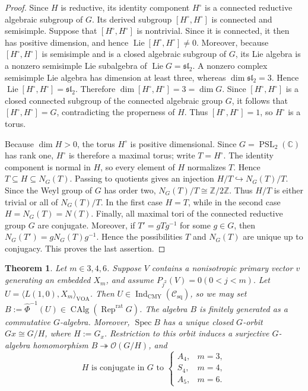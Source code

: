 \documentclass[10pt,a4paper]{amsart}
\numberwithin{equation}{section} \newtheorem{thm}{Theorem}[section] \newtheorem{lem}[thm]{Lemma} \newtheorem{ex}[thm]{Example} \newtheorem{prop}[thm]{Proposition} \newtheorem{cor}[thm]{Corollary} \newtheorem{defi}[thm]{Definition} \newtheorem{rmk}[thm]{Remark} \newtheorem{notation}[thm]{Notation}
\newcommand{\Rep}{\operatorname{Rep}}
\newcommand{\Spec}{\operatorname{Spec}}
\newcommand{\PSL}{\operatorname{PSL}}
\newcommand{\OO}{\mathcal O}
\newcommand{\Csq}{\mathcal C_{\mathrm{sq}}}
\newcommand{\CAlg}{\operatorname{CAlg}}
\newcommand{\IndCMY}{\operatorname{Ind}_{\mathrm{CMY}}}
\def\Z{\mathbb{Z}} \def\N{\mathbb{N}} \def\A{\mathbb{A}} \def\C{\mathbb{C}} \def\R{\mathbb{R}} \def\Q{\mathbb{Q}} \def\F{\mathbb{F}}
\begin{document}
\begin{proof}
Since $H$ is reductive, its identity component $H^\circ$ is a connected reductive algebraic subgroup of $G$. Its derived subgroup $[H^\circ,H^\circ]$ is connected and semisimple. Suppose that $[H^\circ,H^\circ]$ is nontrivial. Since it is connected, it then has positive dimension, and hence \(\operatorname{Lie}[H^\circ,H^\circ]\neq0.\) Moreover, because $[H^\circ,H^\circ]$ is semisimple and is a closed algebraic subgroup of $G$, its Lie algebra is a nonzero semisimple Lie subalgebra of \(\operatorname{Lie}G=\mathfrak{sl}_2.\) A nonzero complex semisimple Lie algebra has dimension at least three, whereas $\dim\mathfrak{sl}_2=3$. Hence \(\operatorname{Lie}[H^\circ,H^\circ]=\mathfrak{sl}_2.\) Therefore $\dim[H^\circ,H^\circ]=3=\dim G$. Since $[H^\circ,H^\circ]$ is a closed connected subgroup of the connected algebraic group $G$, it follows that $[H^\circ,H^\circ]=G$, contradicting the properness of $H$. Thus $[H^\circ,H^\circ]=1$, so $H^\circ$ is a torus.

Because $\dim H>0$, the torus $H^\circ$ is positive dimensional. Since $G=\PSL_2(\C)$ has rank one, $H^\circ$ is therefore a maximal torus; write $T=H^\circ$. The identity component is normal in $H$, so every element of $H$ normalizes $T$. Hence \(T\subseteq H\subseteq N_G(T).\) Passing to quotients gives an injection \(H/T\hookrightarrow N_G(T)/T.\) Since the Weyl group of $G$ has order two, $N_G(T)/T\cong\Z/2\Z$. Thus $H/T$ is either trivial or all of $N_G(T)/T$. In the first case $H=T$, while in the second case $H=N_G(T)=N(T)$. Finally, all maximal tori of the connected reductive group $G$ are conjugate. Moreover, if $T'=gTg^{-1}$ for some $g\in G$, then \(N_G(T')=gN_G(T)g^{-1}.\) Hence the possibilities $T$ and $N_G(T)$ are unique up to conjugacy. This proves the last assertion.
\end{proof}

\begin{thm}\label{thm:closed-orbit}
Let $m\in{3,4,6}$. Suppose $V$ contains a nonisotropic primary vector $v$ generating an embedded $X_m$, and assume \(P_{j^2}(V)=0(0<j<m).\) Let \(U=\langle L(1,0),X_m\rangle_{\mathrm{VOA}}\). Then \(U\in\IndCMY(\Csq)\), so we may set \(B:=\widehat\Phi^{-1}(U)\in\CAlg(\Rep^{\mathrm{rat}}G)\). The algebra $B$ is finitely generated as a commutative $G$-algebra. Moreover, $\Spec B$ has a unique closed $G$-orbit \(Gx\cong G/H\), where \(H:=G_x\). Restriction to this orbit induces a surjective $G$-algebra homomorphism \(B\twoheadrightarrow\OO(G/H)\), and $$ H\text{ is conjugate in }G\text{ to }
\begin{cases}
A_4,&m=3,\\
S_4,&m=4,\\
A_5,&m=6.
\end{cases}
$$
\end{thm}
\end{document}
